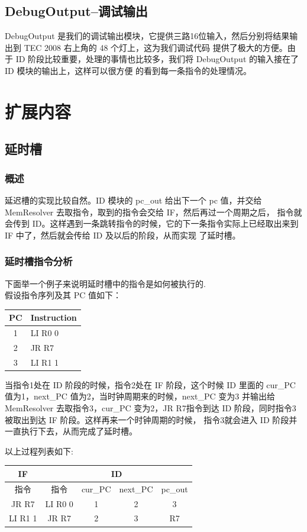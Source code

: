 \documentclass[10pt]{article}
\begin{document}
\begin{CJK}{UTF8}{gbsn}
\subsection{DebugOutput--调试输出}
DebugOutput 是我们的调试输出模块，它提供三路16位输入，然后分别将结果输出到 TEC 2008 右上角的 48 个灯上，这为我们调试代码
提供了极大的方便。由于 ID 阶段比较重要，处理的事情也比较多，我们将 DebugOutput 的输入接在了 ID 模块的输出上，这样可以很方便
的看到每一条指令的处理情况。

\section{扩展内容}
\subsection{延时槽}
\subsubsection{概述}
延迟槽的实现比较自然。ID 模块的 pc\_out 给出下一个 pc 值，并交给 MemResolver 去取指令，取到的指令会交给 IF，然后再过一个周期之后，
指令就会传到 ID。这样遇到一条跳转指令的时候，它的下一条指令实际上已经取出来到 IF 中了，然后就会传给 ID 及以后的阶段，从而实现
了延时槽。

\subsubsection{延时槽指令分析}
下面举一个例子来说明延时槽中的指令是如何被执行的.\\
假设指令序列及其 PC 值如下：\\
\begin{center}
\begin{tabular}{|c|l|}\hline
PC & Instruction \\\hline
1  & LI R0 0\\\hline
2  & JR R7  \\\hline
3  & LI R1 1\\\hline
\end{tabular}
\end{center}

当指令1处在 ID 阶段的时候，指令2处在 IF 阶段，这个时候 ID 里面的 cur\_PC 值为1，next\_PC 值为2，当时钟周期来的时候，next\_PC 变为3
并输出给 MemResolver 去取指令3，cur\_PC 变为2，JR R7指令到达 ID 阶段，同时指令3被取出到达 IF 阶段。这样再来一个时钟周期的时候，
指令3就会进入 ID 阶段并一直执行下去，从而完成了延时槽。

以上过程列表如下:\\
\begin{center}
\begin{tabular}{|c|c|c|c|c|}\hline
IF & \multicolumn{4}{|c|}{ID}\\\hline
指令&指令&cur\_PC&next\_PC&pc\_out\\\hline
JR R7&LI R0 0&1&2&3\\\hline
LI R1 1&JR R7&2&3&R7\\\hline
\end{tabular}
\end{center}



\end{CJK}
\end{document}
